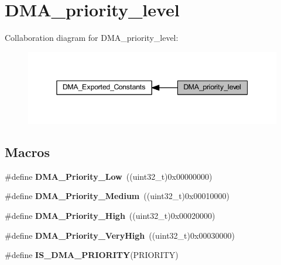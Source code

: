 \hypertarget{group___d_m_a__priority__level}{}\section{D\+M\+A\+\_\+priority\+\_\+level}
\label{group___d_m_a__priority__level}
Collaboration diagram for D\+M\+A\+\_\+priority\+\_\+level\+:
\nopagebreak
\begin{figure}[H]
\begin{center}
\leavevmode
\includegraphics[width=345pt]{group___d_m_a__priority__level}
\end{center}
\end{figure}
\subsection*{Macros}
\begin{DoxyCompactItemize}
\item 
\mbox{\label{group___d_m_a__priority__level_gaf414e0aa8dd42aee6f83f88ab6175179}} 
\#define {\bfseries D\+M\+A\+\_\+\+Priority\+\_\+\+Low}~((uint32\+\_\+t)0x00000000)
\item 
\mbox{\label{group___d_m_a__priority__level_ga8e0d4a958f4288c6c759945789490f38}} 
\#define {\bfseries D\+M\+A\+\_\+\+Priority\+\_\+\+Medium}~((uint32\+\_\+t)0x00010000)
\item 
\mbox{\label{group___d_m_a__priority__level_gae2441c0b4d4ba9945a6f4f7d08045a8e}} 
\#define {\bfseries D\+M\+A\+\_\+\+Priority\+\_\+\+High}~((uint32\+\_\+t)0x00020000)
\item 
\mbox{\label{group___d_m_a__priority__level_gadccd2f8b2ac24ba4fd485dd5b9b48671}} 
\#define {\bfseries D\+M\+A\+\_\+\+Priority\+\_\+\+Very\+High}~((uint32\+\_\+t)0x00030000)
\item 
\#define {\bfseries I\+S\+\_\+\+D\+M\+A\+\_\+\+P\+R\+I\+O\+R\+I\+TY}(P\+R\+I\+O\+R\+I\+TY)
\end{DoxyCompactItemize}



